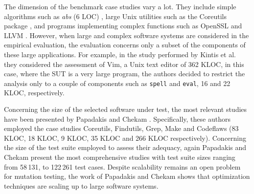 The dimension of the benchmark case studies vary a lot. They include simple algorithms such as \textit{abs} (6 LOC) \cite{tokumoto2016muvm}, large Unix utilities such as the Coreutils package \cite{hariri2019comparing,papadakis2018mutation,chekam2017empirical}, and programs implementing complex functions such as OpenSSL and LLVM \cite{denisov2018mull}.
However, when large and complex software systems are considered in the empirical evaluation, the evaluation concerns only a subset of the components of these large applications.
For example, in the study performed by Kintis et al. \cite{kintis2017detecting} they considered the assessment of Vim, a Unix text editor of 362 KLOC, in this case, where the SUT is a very large program, the authors decided to restrict the analysis only to a couple of components such as \texttt{spell} and \texttt{eval}, 16 and 22 KLOC, respectively. 


Concerning the size of the selected software under test, the most relevant studies have been presented by Papadakis and Chekam \cite{papadakis2018mutation,chekam2017empirical,papadakis2018mutant}. Specifically, these authors employed the case studies Coreutils, Findutils, Grep, Make and Codeflaws (83 KLOC, 18 KLOC, 9 KLOC, 35 KLOC and 266 KLOC respectively). 
Concerning the size of the test suite employed to assess their adequacy, again Papadakis and Chekam \cite{papadakis2018mutation,chekam2017empirical,papadakis2018mutant} present the most comprehensive studies with test suite sizes ranging from 58\,131, to 122\,261 test cases.
Despite scalability remains an open problem for mutation testing, the work of Papadakis and Chekam \cite{papadakis2018mutation,chekam2017empirical,papadakis2018mutant} shows that optimization techniques are scaling up to large software systems.





